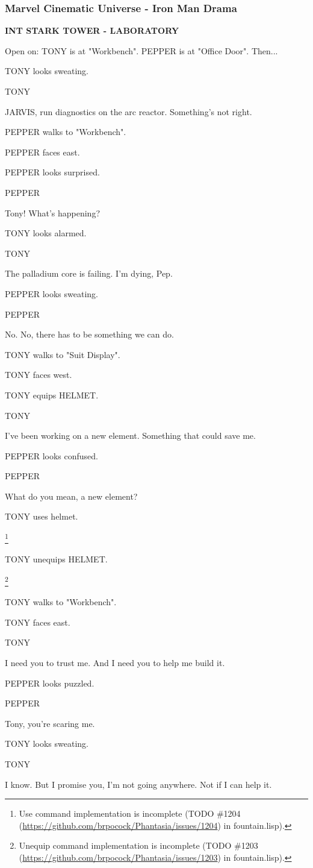 \documentclass[11pt,letterpaper,oldstylefigures]{memoir}
\newcommand{\slugline}[1]{\nobreak\textbf{\MakeUppercase{#1}}\par\nobreak\vspace{1\baselineskip}}
\newcommand{\speaker}[1]{\nobreak\hspace*{0.333\textwidth}\MakeUppercase{#1}\par\nobreak\vspace{0.5\baselineskip}}
\newcommand{\dialogue}[1]{\nobreak\hspace*{0.25\textwidth}\begin{minipage}{0.5\textwidth}#1\end{minipage}\par\vspace{1\baselineskip}}
\newcommand{\stagedir}[1]{#1\par\vspace{1\baselineskip}}
\newenvironment{FountainExample}
  {\begingroup
  \ttfamily\small
   \setlength{\parindent}{0pt}
  \setlength{\parskip}{0.5em}
  \allowdisplaybreaks
  \setlength{\displaywidowpenalty}{0}
  \setlength{\widowpenalty}{0}
  \setlength{\clubpenalty}{0}
  \setlength{\interlinepenalty}{0}
}
  {\endgroup}
\begin{document}
\subsubsection*{Marvel Cinematic Universe - Iron Man Drama}
\label{ex:marvel-cinematic-universe-iron-man-drama}

\begin{FountainExample}
\slugline{INT STARK TOWER - LABORATORY}

\stagedir{Open on: TONY is at "Workbench". PEPPER is at "Office Door". Then...}

\stagedir{TONY looks sweating.}

\speaker{TONY}
\dialogue{JARVIS, run diagnostics on the arc reactor. Something's not right.}

\stagedir{PEPPER walks to "Workbench".}

\stagedir{PEPPER faces east.}

\stagedir{PEPPER looks surprised.}

\speaker{PEPPER}
\dialogue{Tony! What's happening?}

\stagedir{TONY looks alarmed.}

\speaker{TONY}
\dialogue{The palladium core is failing. I'm dying, Pep.}

\stagedir{PEPPER looks sweating.}

\speaker{PEPPER}
\dialogue{No. No, there has to be something we can do.}

\stagedir{TONY walks to "Suit Display".}

\stagedir{TONY faces west.}

\stagedir{TONY equips HELMET.}

\speaker{TONY}
\dialogue{I've been working on a new element. Something that could save me.}

\stagedir{PEPPER looks confused.}

\speaker{PEPPER}
\dialogue{What do you mean, a new element?}

\stagedir{TONY uses helmet.}\footnote{Use command implementation is incomplete (TODO \#1204 (\href{https://github.com/brpocock/Phantasia/issues/1204}{https://github.com/brpocock/Phantasia/issues/1204}) in fountain.lisp).}

\stagedir{TONY unequips HELMET.}\footnote{Unequip command implementation is incomplete (TODO \#1203 (\href{https://github.com/brpocock/Phantasia/issues/1203}{https://github.com/brpocock/Phantasia/issues/1203}) in fountain.lisp).}

\stagedir{TONY walks to "Workbench".}

\stagedir{TONY faces east.}

\speaker{TONY}
\dialogue{I need you to trust me. And I need you to help me build it.}

\stagedir{PEPPER looks puzzled.}

\speaker{PEPPER}
\dialogue{Tony, you're scaring me.}

\stagedir{TONY looks sweating.}

\speaker{TONY}
\dialogue{I know. But I promise you, I'm not going anywhere. Not if I can help it.}
\end{FountainExample}
\end{document}
